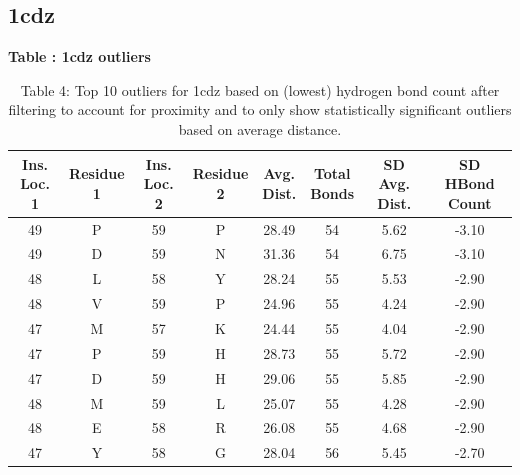 \documentclass[sigconf, screen, authorversion, authoraddress=false, oneside]{acmart}
\begin{document}
\subsection{1cdz}
\begin{table}[!ht] %
    \centering
    \textbf{\large Table \thetable: 1cdz outliers} \\[1ex]
    {\small
    \setlength{\tabcolsep}{2pt} %
    \begin{tabular}{cccccccc}
    \toprule
    \makecell{Ins.\\Loc. 1} & 
    \makecell{Residue\\1} & 
    \makecell{Ins.\\Loc. 2} & 
    \makecell{Residue\\2} & 
    \makecell{Avg.\\Dist.} & 
    \makecell{Total\\Bonds} & 
    \makecell{SD Avg.\\Dist.} & 
    \makecell{SD HBond\\Count} \\
    \midrule
    49 & P & 59 & P & 28.49 & 54 & 5.62 & -3.10 \\
    49 & D & 59 & N & 31.36 & 54 & 6.75 & -3.10 \\
    48 & L & 58 & Y & 28.24 & 55 & 5.53 & -2.90 \\
    48 & V & 59 & P & 24.96 & 55 & 4.24 & -2.90 \\
    47 & M & 57 & K & 24.44 & 55 & 4.04 & -2.90 \\
    47 & P & 59 & H & 28.73 & 55 & 5.72 & -2.90 \\
    47 & D & 59 & H & 29.06 & 55 & 5.85 & -2.90 \\
    48 & M & 59 & L & 25.07 & 55 & 4.28 & -2.90 \\
    48 & E & 58 & R & 26.08 & 55 & 4.68 & -2.90 \\
    47 & Y & 58 & G & 28.04 & 56 & 5.45 & -2.70 \\
    \bottomrule
    \end{tabular}
    }
    \caption*{Table 4: Top 10 outliers for 1cdz based on (lowest) hydrogen bond count after filtering to account for proximity and to only show statistically significant outliers based on average distance.}
    \label{table:4}
\end{table}
\end{document}
